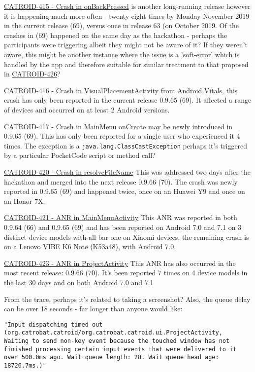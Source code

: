 \href{https://jira.catrob.at/browse/CATROID-415}{CATROID-415 - Crash in onBackPressed} is another long-running release however it is happening much more often - twenty-eight times by Monday  November 2019 in the current release (69), versus once in release 63 (on  October 2019. Of the crashes in (69) happened on the same day as the hackathon - perhaps the participants were triggering albeit they might not be aware of it? If they weren't aware, this might be another instance where the issue is a 'soft-error' which is handled by the app and therefore suitable for similar treatment to that proposed in \href{https://jira.catrob.at/browse/CATROID-426}{CATROID-426}?

\href{https://jira.catrob.at/browse/CATROID-416}{CATROID-416 - Crash in VisualPlacementActivity} from Android Vitals, this crash has only been reported in the current release 0.9.65 (69). It affected a range of devices and occurred on at least 2 Android versions.

\href{https://jira.catrob.at/browse/CATROID-417}{CATROID-417 - Crash in MainMenu onCreate} may be newly introduced in 0.9.65 (69). This has only been reported for a single user who experienced it 4 times. The exception is a \texttt{java.lang.ClassCastException} perhaps it's triggered by a particular PocketCode script or method call?

\href{https://jira.catrob.at/browse/CATROID-420}{CATROID-420 - Crash in resolveFileName} This was addressed two days after the hackathon and merged into the next release 0.9.66 (70). The crash was newly reported in 0.9.65 (69) and happened twice, once on an Huawei Y9 and once on an Honor 7X.

\href{https://jira.catrob.at/browse/CATROID-421}{CATROID-421 - ANR in MainMenuActivity} This ANR was reported in both 0.9.64 (66) and 0.9.65 (69) and has been reported on Android 7.0 and 7.1 on 3 distinct device models with all bar one on Xiaomi devices, the remaining crash is on a Lenovo VIBE K6 Note (K53a48), with Android 7.0.

\href{https://jira.catrob.at/browse/CATROID-423}{CATROID-423 - ANR in ProjectActivity} This ANR has also occurred in the most recent release: 0.9.66 (70). It's been reported 7 times on 4 device models in the last 30 days and on both Android 7.0 and 7.1

From the trace, perhaps it's related to taking a screenshot? Also, the queue delay can be over 18 seconds - far longer than anyone would like:

\texttt{\footnotesize{"Input dispatching timed out \\(org.catrobat.catroid/org.catrobat.catroid.ui.ProjectActivity, \\Waiting to send non-key event because the touched window has not finished processing certain input events that were delivered to it over 500.0ms ago. Wait queue length: 28. Wait queue head age: 18726.7ms.)"}}

